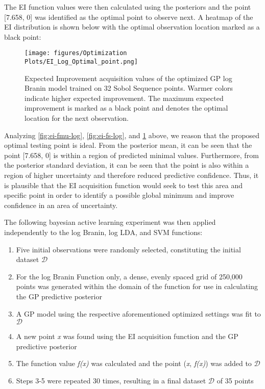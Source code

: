 \documentclass[11pt]{article}
\numberwithin{equation}{section}
\begin{document}
The EI function values were then calculated using the posteriors and the point [7.658, 0] was identified as the optimal point to observe next. 
A heatmap of the EI distribution is shown below with the optimal observation location marked as a black point:

\begin{figure}[H]
  \centering
  \texttt{[image: figures/Optimization Plots/EI\_Log\_Optimal\_point.png]}
  \caption{Expected Improvement acquisition values of the optimized GP log Branin model trained on 32 Sobol Sequence points. Warmer colors indicate higher expected improvement. The maximum expected improvement is marked as a black point and denotes the optimal location for the next observation.}
  \label{fig:ei-optimalPoint-log}
\end{figure}

Analyzing \ref{fig:ei-fmu-log}, \ref{fig:ei-fs-log}, and \ref{fig:ei-optimalPoint-log} above, we reason that the proposed optimal testing point is ideal. From the posterior mean, it can be seen that the point [7.658, 0] is within a region of predicted minimal values. Furthermore, from the posterior standard deviation, it can be seen that the point is also within a region of higher uncertainty and therefore reduced predictive confidence. Thus, it is plausible that the EI acquisition function would seek to test this area and specific point in order to identify a possible global minimum and improve confidence in an area of uncertainty. 

The following bayesian active learning experiment was then applied independently to the log Branin, log LDA, and SVM functions:
\begin{enumerate}
  \item Five initial observations were randomly selected, constituting the initial dataset $\mathcal{D}$
  \item For the log Branin Function only, a dense, evenly spaced grid of 250,000 points was generated within the domain of the function for use in calculating the GP predictive posterior
  \item A GP model using the respective aforementioned optimized settings was fit to $\mathcal{D}$
  \item A new point \emph{x} was found using the EI acquisition function and the GP predictive posterior
  \item The function value \emph{f(x)} was calculated and the point (\emph{x}, \emph{f(x)}) was added to $\mathcal{D}$
  \item Steps 3-5 were repeated 30 times, resulting in a final dataset $\mathcal{D}$ of 35 points
\end{enumerate}
\end{document}
